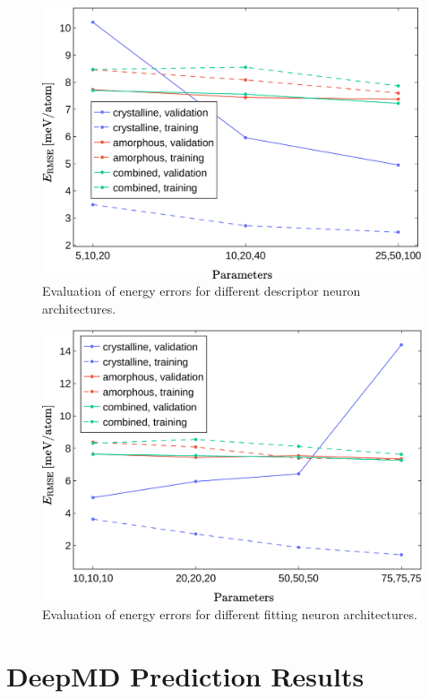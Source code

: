 \begin{figure}
  \begin{center}
    \includegraphics[width=.8\textwidth]{
      asset/descriptor_energy_error_evaluation.jpg
    }
  \end{center}
  \caption{Evaluation of energy errors for different descriptor neuron
  architectures.}
  \label{fig:descriptor_energy_error_evaluation}
\end{figure}

\begin{figure}
  \begin{center}
    \includegraphics[width=.8\textwidth]{
      asset/fitting_energy_error_evaluation.jpg
    }
  \end{center}
  \caption{Evaluation of energy errors for different fitting neuron
  architectures.}
  \label{fig:fitting_energy_error_evaluation}
\end{figure}

\section{DeepMD Prediction Results}

